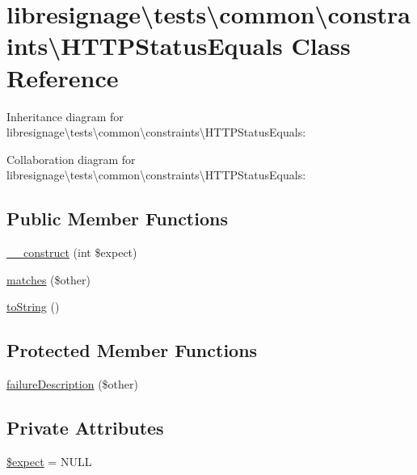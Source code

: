 \hypertarget{classlibresignage_1_1tests_1_1common_1_1constraints_1_1HTTPStatusEquals}{}\section{libresignage\textbackslash{}tests\textbackslash{}common\textbackslash{}constraints\textbackslash{}H\+T\+T\+P\+Status\+Equals Class Reference}
\label{classlibresignage_1_1tests_1_1common_1_1constraints_1_1HTTPStatusEquals}


Inheritance diagram for libresignage\textbackslash{}tests\textbackslash{}common\textbackslash{}constraints\textbackslash{}H\+T\+T\+P\+Status\+Equals\+:


Collaboration diagram for libresignage\textbackslash{}tests\textbackslash{}common\textbackslash{}constraints\textbackslash{}H\+T\+T\+P\+Status\+Equals\+:
\subsection*{Public Member Functions}
\begin{DoxyCompactItemize}
\item 
\hyperlink{classlibresignage_1_1tests_1_1common_1_1constraints_1_1HTTPStatusEquals_aab38a0046cfa450f03229b29d3bbcb15}{\+\_\+\+\_\+construct} (int \$expect)
\item 
\hyperlink{classlibresignage_1_1tests_1_1common_1_1constraints_1_1HTTPStatusEquals_a822f4391fd6b38e41243162efb03cc45}{matches} (\$other)
\item 
\hyperlink{classlibresignage_1_1tests_1_1common_1_1constraints_1_1HTTPStatusEquals_a9958fb251b7c5e8e771d6f0269b8a730}{to\+String} ()
\end{DoxyCompactItemize}
\subsection*{Protected Member Functions}
\begin{DoxyCompactItemize}
\item 
\hyperlink{classlibresignage_1_1tests_1_1common_1_1constraints_1_1HTTPStatusEquals_a22ee7269dbabed1a362a547d1e74be37}{failure\+Description} (\$other)
\end{DoxyCompactItemize}
\subsection*{Private Attributes}
\begin{DoxyCompactItemize}
\item 
\hyperlink{classlibresignage_1_1tests_1_1common_1_1constraints_1_1HTTPStatusEquals_aa44d64fdb8983aa08089b8c6af29a326}{\$expect} = N\+U\+LL
\end{DoxyCompactItemize}


